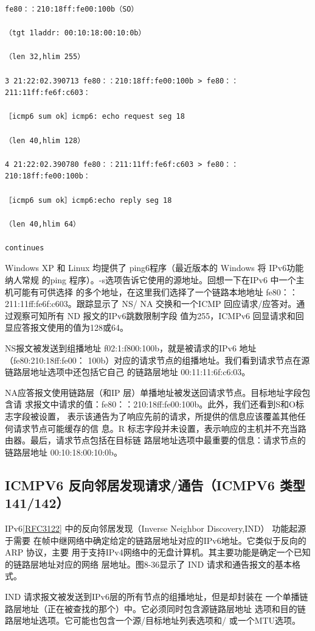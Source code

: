 \begin{verbatim}
fe80：：210:18ff:fe00:100b（SO）

（tgt 1laddr: 00:10:18:00:10:0b）

（len 32,hlim 255）

3 21:22:02.390713 fe80：：210:18ff:fe00:100b > fe80：：211:11ff:fe6f:c603：

［icmp6 sum ok］icmp6: echo request seg 18

（len 40,hlim 128）

4 21:22:02.390780 fe80：：211:11ff:fe6f:c603 > fe80：：210:18ff:fe00:100b：

［icmp6 sum ok］icmp6:echo reply seg 18

（len 40,hlim 64）

continues
\end{verbatim}

Windows XP 和 Linux 均提供了 ping6程序（最近版本的 Windows 将 IPv6功能纳人常规
的ping 程序）。-s选项告诉它使用的源地址。回想一下在IPv6 中一个主机可能有可供选择
的多个地址，在这里我们选择了一个链路本地地址 fe80：：211:11ff:fe6f:c603。跟踪显示了 NS/
NA 交换和一个ICMP 回应请求/应答对。通过观察可知所有 ND 报文的IPv6跳数限制字段
值为255，ICMPv6 回显请求和回显应答报文使用的值为128或64。

NS报文被发送到组播地址 f02:1:f800:100b，就是被请求的IPv6 地址 （fe80:210:18ff:fe00：
100b）对应的请求节点的组播地址。我们看到请求节点在源链路层地址选项中还包括它自己
的链路层地址 00:11:11:6f:c6:03。

NA应答报文使用链路层（和IP 层）单播地址被发送回请求节点。目标地址字段包含请
求报文中请求的值：fe80：：210:18ff:fe00:100b。此外，我们还看到S和O标志字段被设置，
表示该通告为了响应先前的请求，所提供的信息应该覆盖其他任何请求节点可能缓存的信
息。R 标志字段并未设置，表示响应的主机并不充当路由器。最后，请求节点包括在目标链
路层地址选项中最重要的信息：请求节点的链路层地址 00:10:18:00:10:0b。

\subsection{ICMPV6 反向邻居发现请求/通告（ICMPV6 类型141/142）}

IPv6\href{https://www.rfc-editor.org/rfc/rfc3122}{[RFC3122]} 中的反向邻居发现（Inverse Neighbor Discovery,IND） 功能起源于需要
在帧中继网络中确定给定的链路层地址对应的IPv6地址。它类似于反向的ARP 协议，主要
用于支持IPv4网络中的无盘计算机。其主要功能是确定一个已知的链路层地址对应的网络
层地址。图8-36显示了 IND 请求和通告报文的基本格式。

IND 请求报文被发送到IPv6层的所有节点的组播地址，但是却封装在
一个单播链路层地址（正在被查找的那个）中。它必须同时包含源链路层地址
选项和目的链路层地址选项。它可能也包含一个源/目标地址列表选项和/
或一个MTU选项。

